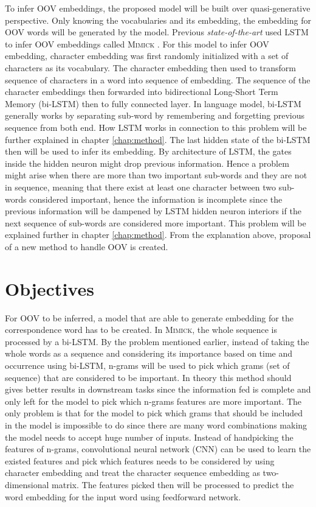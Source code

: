     To infer OOV embeddings, the proposed model will be built over
    quasi-generative perspective. Only knowing the vocabularies and
    its embedding, the embedding for OOV words will be generated by
    the model. Previous \textit{state-of-the-art} used LSTM to infer
    OOV embeddings called \textsc{Mimick} \citep{mimicking2017Pinter}.
    For this model to infer OOV embedding, character embedding was
    first randomly initialized with a set of characters as its
    vocabulary. The character embedding then used to transform
    sequence of characters in a word into sequence of embedding. The
    sequence of the character embeddings then forwarded into
    bidirectional Long-Short Term Memory (bi-LSTM) then to fully
    connected layer. In language model, bi-LSTM generally works by
    separating sub-word by remembering and forgetting previous
    sequence from both end. How LSTM works in connection to this
    problem will be further explained in chapter \ref{chap:method}.
    The last hidden state of the bi-LSTM then will be used to infer
    its embedding. By architecture of LSTM, the gates inside the
    hidden neuron might drop previous information. Hence a problem
    might arise when there are more than two important sub-words and
    they are not in sequence, meaning that there exist at least one
    character between two sub-words considered important, hence the
    information is incomplete since the previous information will be
    dampened by LSTM hidden neuron interiors if the next sequence of
    sub-words are considered more important. This problem will be
    explained further in chapter \ref{chap:method}. From the
    explanation above, proposal of a new method to handle OOV is
    created.

\section{Objectives}
    For OOV to be inferred, a model that are able to generate
    embedding for the correspondence word has to be created. In
    \textsc{Mimick}, the whole sequence is processed by a bi-LSTM. By
    the problem mentioned earlier, instead of taking the whole words
    as a sequence and considering its importance based on time and
    occurrence using bi-LSTM, n-grams will be used to pick which grams
    (set of sequence) that are considered to be important. In theory
    this method should gives better results in downstream tasks since
    the information fed is complete and only left for the model to
    pick which n-grams features are more important. The only problem
    is that for the model to pick which grams that should be included
    in the model is impossible to do since there are many word
    combinations making the model needs to accept huge number of
    inputs. Instead of handpicking the features of n-grams,
    convolutional neural network (CNN) can be used to learn the
    existed features and pick which features needs to be considered by
    using character embedding and treat the character sequence
    embedding as two-dimensional matrix. The features picked then will
    be processed to predict the word embedding for the input word
    using feedforward network.

